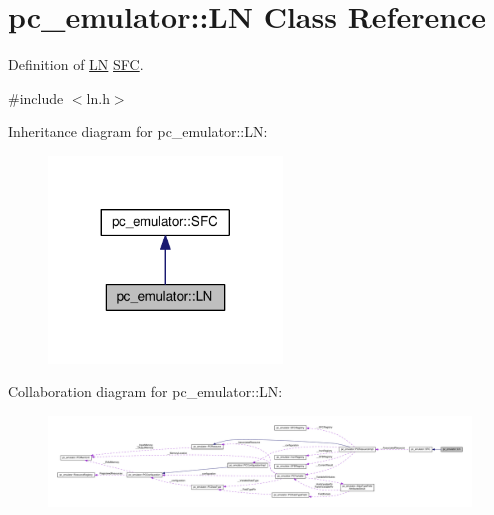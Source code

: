 \hypertarget{classpc__emulator_1_1LN}{}\section{pc\+\_\+emulator\+:\+:LN Class Reference}
\label{classpc__emulator_1_1LN}


Definition of \hyperlink{classpc__emulator_1_1LN}{LN} \hyperlink{classpc__emulator_1_1SFC}{S\+FC}.  




{\ttfamily \#include $<$ln.\+h$>$}



Inheritance diagram for pc\+\_\+emulator\+:\+:LN\+:
\nopagebreak
\begin{figure}[H]
\begin{center}
\leavevmode
\includegraphics[width=176pt]{classpc__emulator_1_1LN__inherit__graph}
\end{center}
\end{figure}


Collaboration diagram for pc\+\_\+emulator\+:\+:LN\+:
\nopagebreak
\begin{figure}[H]
\begin{center}
\leavevmode
\includegraphics[width=350pt]{classpc__emulator_1_1LN__coll__graph}
\end{center}
\end{figure}

